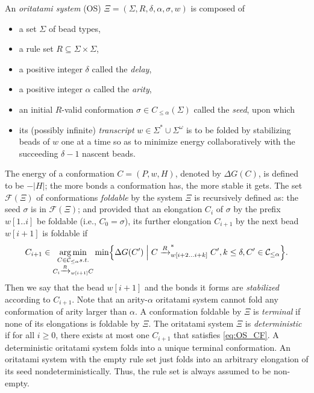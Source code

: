 \documentclass[runningheads]{llncs}
\DeclareMathOperator*{\argmin}{arg\,min}
\begin{document}
An \textit{oritatami system} (OS) $\Xi = (\Sigma, R, \delta, \alpha, \sigma, w)$ is composed of
\begin{itemize}
\item a set $\Sigma$ of bead types, 
\item a rule set $R \subseteq \Sigma \times \Sigma$, 
\item a positive integer $\delta$ called the \textit{delay}, 
\item a positive integer $\alpha$ called the \textit{arity}, 
\item an initial $R$-valid conformation $\sigma \in C_{\le \alpha}(\Sigma)$ called the \textit{seed}, upon which 
\item its (possibly infinite) \textit{transcript} $w \in \Sigma^* \cup \Sigma^\omega$ is to be folded by stabilizing beads of $w$ one at a time so as to minimize energy collaboratively with the succeeding $\delta{-}1$ nascent beads. 
\end{itemize}
The energy of a conformation $C = (P, w, H)$, denoted by $\Delta G(C)$, is defined to be ${-}|H|$; the more bonds a conformation has, the more stable it gets. 
The set $\mathcal{F}(\Xi)$ of conformations \textit{foldable} by the system $\Xi$ is recursively defined as: the seed $\sigma$ is in $\mathcal{F}(\Xi)$; and provided that an elongation $C_i$ of $\sigma$ by the prefix $w[1..i]$ be foldable (i.e., $C_0 = \sigma$), its further elongation $C_{i+1}$ by the next bead $w[i+1]$ is foldable if 
\begin{equation}\label{eq:OS_CF}
C_{i+1} \in \argmin_{
\substack{
C \in \mathcal{C}_{\le \alpha} s.t. \\
C_i \xrightarrow{R}_{w[i+1]}C \\
}
}
\min \Bigl\{ \Delta G(C') \Bigm|
C \xrightarrow{R}^*_{w[i+2...i+k]}C', k\le \delta, C' \in \mathcal{C}_{\le \alpha}
\Bigr\}.
\end{equation}
%
Then we say that the bead $w[i+1]$ and the bonds it forms are \textit{stabilized} according to $C_{i+1}$. 
Note that an arity-$\alpha$ oritatami system cannot fold any conformation of arity larger than $\alpha$. 
A conformation foldable by $\Xi$ is \textit{terminal} if none of its elongations is foldable by $\Xi$. 
The oritatami system $\Xi$ is \textit{deterministic} if for all $i \ge 0$, there exists at most one $C_{i+1}$ that satisfies \eqref{eq:OS_CF}. 
A deterministic oritatami system folds into a unique terminal conformation. 
An oritatami system with the empty rule set just folds into an arbitrary elongation of its seed nondeterministically. 
Thus, the rule set is always assumed to be non-empty. 
\end{document}
